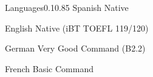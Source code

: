 \documentclass{federico_cv}
\begin{document}
\begin{tblSection}{Languages}{0.1}{0.85}
\leftrightsingletight
{Spanish}
{Native}

\leftrightsingletight
{English}
{Native (iBT TOEFL 119/120)}

\leftrightsingletight
{German}
{Very Good Command (B2.2)}

\leftrightsingletight
{French}
{Basic Command}

\end{tblSection}
\end{document}
